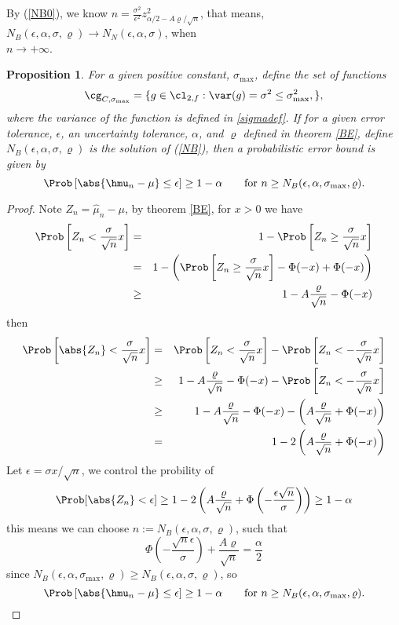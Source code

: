 \documentclass[12pt]{amsart}
\newtheorem{prop}[theorem]{Proposition}
\begin{document}
By (\ref{NB0}), we know $n=\displaystyle\frac{\sigma^2}{\epsilon^2}\displaystyle z^2_{\alpha/2-A\varrho/\sqrt{n}}$, that means,
$N_{B}(\epsilon,\alpha,\sigma,\varrho)\rightarrow N_{N}(\epsilon,\alpha,\sigma)$, when \\$n\rightarrow+\infty$.
\begin{prop}  For a given positive constant, $\sigma_{\max}$, define the set of functions
\[
\cg_{C,\sigma_{\max}}= \{g \in \cl_{2,f} : \var(g)= \sigma^2 \le \sigma^2_{\max}, \},
\]
where the variance of the function is defined in \eqref{sigmadef}. If for a given error tolerance, $\epsilon$, an uncertainty tolerance, $\alpha$, and $\varrho$ defined in theorem \ref{BE}, define $N_B(\epsilon,\alpha,\sigma,\varrho)$ is the solution of (\ref{NB}), then a probabilistic error bound is given by
\[
\Prob\left[\abs{\hmu_n-\mu} \le \epsilon \right] \ge 1-\alpha \qquad \text{for } n\ge N_{B}(\epsilon,\alpha,\sigma_{\max},\varrho).
\]
\end{prop}
\begin{proof}
Note $Z_n=\hat{\mu}_n-\mu$, by theorem \ref{BE}, for $x>0$ we have
\begin{eqnarray*}
\Prob\left[Z_n<\frac{\sigma}{\sqrt{n}}x\right]&=&1-\Prob\left[Z_n\geq\frac{\sigma}{\sqrt{n}}x\right]\\
&=&1-\left(\Prob\left[Z_n\geq\frac{\sigma}{\sqrt{n}}x\right]-\Phi(-x)+\Phi(-x)\right)\\
&\geq& 1-A\frac{\varrho}{\sqrt{n}}-\Phi(-x)
\end{eqnarray*}
then
\begin{eqnarray*}
\Prob\left[\abs{Z_n}<\frac{\sigma}{\sqrt{n}}x\right]&=&\Prob\left[Z_n<\frac{\sigma}{\sqrt{n}}x\right]-\Prob\left[Z_n<-\frac{\sigma}{\sqrt{n}}x\right]\\
&\geq & 1-A\frac{\varrho}{\sqrt{n}}-\Phi(-x)-\Prob\left[Z_n<-\frac{\sigma}{\sqrt{n}}x\right]\\
&\geq & 1-A\frac{\varrho}{\sqrt{n}}-\Phi(-x)-\left(A\frac{\varrho}{\sqrt{n}}+\Phi(-x)\right)\\
&=& 1-2\left(A\frac{\varrho}{\sqrt{n}}+\Phi(-x)\right)
\end{eqnarray*}
Let $\epsilon=\sigma x/\sqrt{n}$, we control the probility of
$$\Prob[\abs{Z_n}<\epsilon]\geq 1-2\left(A\frac{\varrho}{\sqrt{n}}+\Phi\left(-\frac{\epsilon\sqrt{n}}{\sigma}\right)\right)\geq 1-\alpha$$
this means we can choose $n:=N_B(\epsilon,\alpha,\sigma,\varrho)$, such that
\begin{equation}\label{NB}
\Phi(-\frac{\sqrt{n}\epsilon}{\sigma})+\frac{A\varrho}{\sqrt{n}}=\frac{\alpha}{2}
\end{equation}
since $N_{B}(\epsilon,\alpha,\sigma_{\max},\varrho)\geq N_{B}(\epsilon,\alpha,\sigma,\varrho)$, so
\[
\Prob\left[\abs{\hmu_n-\mu} \le \epsilon \right] \ge 1-\alpha \qquad \text{for } n\ge N_{B}(\epsilon,\alpha,\sigma_{\max},\varrho).
\]
\end{proof}
\end{document}
